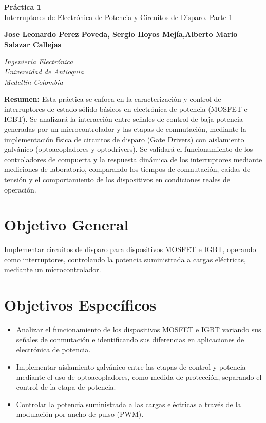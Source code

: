 \documentclass[12pt]{article}
\newcommand{\estudiantes}{Jose Leonardo Perez Poveda, Sergio Hoyos Mejía,Alberto Mario Salazar Callejas}
\begin{document}
\begin{center}
    {\Huge \textcolor{tituloazul}{\textbf{Práctica 1}\\ Interruptores de Electrónica de Potencia y Circuitos de Disparo. Parte 1}}
    \vspace{0.6cm}

    {\textbf{\estudiantes}}
    \vspace{0.5cm}

    \textit{Ingeniería Electrónica}\\
    \textit{Universidad de Antioquia}\\
    \textit{Medellín-Colombia}
\end{center}

\vspace{0.5cm}

\noindent\textcolor{tituloazul}{\textbf{Resumen:}} Esta práctica se enfoca en la caracterización y control de interruptores de estado sólido básicos en electrónica de potencia (MOSFET e IGBT). Se analizará la interacción entre señales de control de baja potencia generadas por un microcontrolador y las etapas de conmutación, mediante la implementación física de circuitos de disparo (Gate Drivers) con aislamiento galvánico (optoacopladores y optodrivers). Se validará el funcionamiento de los controladores de compuerta  y la respuesta dinámica de los interruptores mediante mediciones de laboratorio, comparando los tiempos de conmutación, caídas de tensión y el comportamiento de los dispositivos en condiciones reales de operación.


\section{Objetivo General}
Implementar circuitos de disparo para dispositivos MOSFET e IGBT, operando como interruptores, controlando la potencia suministrada a cargas eléctricas, mediante un microcontrolador.

\section{Objetivos Específicos}
    \begin{itemize}
        \item Analizar el funcionamiento de los dispositivos MOSFET e IGBT variando sus señales de conmutación e identificando sus diferencias en aplicaciones de electrónica de potencia.
        \item Implementar aislamiento galvánico entre las etapas de control y potencia mediante el uso de optoacopladores, como medida de protección, separando el control de la etapa de potencia.
        \item Controlar la potencia suministrada a las cargas eléctricas a través de la modulación por ancho de pulso (PWM).
    \end{itemize}
\end{document}
